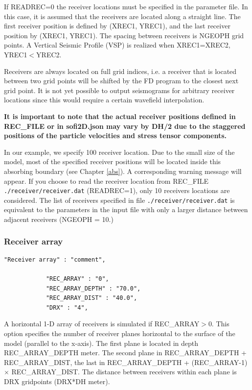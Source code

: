 \documentclass[11pt,onecolumn,oneside]{article}
\begin{document}
If READREC=0 the receiver locations must be specified in the parameter file. In this case, it is assumed that the receivers are located along a straight line. The first receiver position is defined by (XREC1, YREC1), and the last receiver position by (XREC1, YREC1). The spacing between receivers is NGEOPH grid points.  A Vertical Seismic Profile (VSP) is realized when XREC1=XREC2, YREC1$<$YREC2.  

Receivers are always located on full grid indices, i.e. a receiver that is located between two grid points will be shifted by the FD program to the closest next grid point. It is not yet possible
to output seismograms for arbitrary receiver locations since this would require a certain wavefield interpolation.

\textbf{It is important to note that the actual receiver positions defined in REC\_FILE or in sofi2D.json may vary by DH/2 due to the staggered positions of the particle velocities and stress tensor components. }

In our example, we specify 100 receiver location. Due to the small size of the model, most of the specified receiver positions will be located inside this absorbing boundary (see Chapter \ref{abs}). A corresponding warning message will appear. If you choose to read the receiver location from REC\_FILE \texttt{./receiver/receiver.dat} (READREC=1), only 10 receivers locations are considered. The list of receivers specified in file \texttt{./receiver/receiver.dat} is equivalent to the parameters in the input file with only a larger distance between adjacent receivers (NGEOPH = 10.)

\subsubsection{Receiver array}
\begin{verbatim}
"Receiver array" : "comment",

			"REC_ARRAY" : "0",
			"REC_ARRAY_DEPTH" : "70.0",
			"REC_ARRAY_DIST" : "40.0", 
			"DRX" : "4",

\end{verbatim}

A horizontal 1-D array of receivers is simulated if REC\_ARRAY$>$0. This option specifies the number of receiver planes horizontal to the surface of the model (parallel to the x-axis). The first plane is located in depth REC\_ARRAY\_DEPTH meter. The second plane in REC\_ARRAY\_DEPTH + REC\_ARRAY\_DIST, the last in REC\_ARRAY\_DEPTH + (REC\_ARRAY-1) $\times$ REC\_ARRAY\_DIST. The distance between receivers within each plane is DRX gridpoints (DRX*DH meter).
\end{document}
